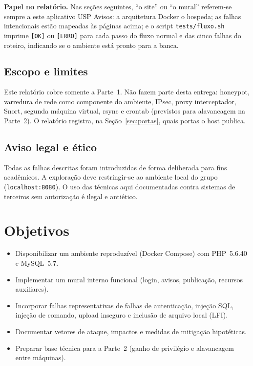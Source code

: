   \textbf{Papel no relatório.} Nas seções seguintes, ``o site'' ou ``o mural'' referem-se sempre a este
  aplicativo USP Avisos: a arquitetura Docker o hospeda; as falhas intencionais estão mapeadas às
  páginas acima; e o script \texttt{tests/fluxo.sh} imprime \texttt{[OK]} ou \texttt{[ERRO]} para cada
  passo do fluxo normal e das cinco falhas do roteiro, indicando se o ambiente está pronto para a banca.
  
  \subsection{Escopo e limites}
  
  Este relatório cobre somente a Parte~1. Não fazem parte desta entrega: honeypot, varredura de rede
  como componente do ambiente, IPsec, proxy interceptador, Snort, segunda máquina virtual, rsync e
  crontab (previstos para alavancagem na Parte~2). O relatório registra, na Seção~\ref{sec:portas},
  quais portas o host publica.
  
  \subsection{Aviso legal e ético}
  
  Todas as falhas descritas foram introduzidas de forma deliberada para fins acadêmicos. A exploração
  deve restringir-se ao ambiente local do grupo (\texttt{localhost:8080}). O uso das técnicas aqui
  documentadas contra sistemas de terceiros sem autorização é ilegal e antiético.
  
  \section{Objetivos}
  
  \begin{itemize}
      \item Disponibilizar um ambiente reproduzível (Docker Compose) com PHP~5.6.40 e MySQL~5.7.
      \item Implementar um mural interno funcional (login, avisos, publicação, recursos auxiliares).
      \item Incorporar falhas representativas de falhas de autenticação, injeção SQL, injeção de
            comando, upload inseguro e inclusão de arquivo local (LFI).
      \item Documentar vetores de ataque, impactos e medidas de mitigação hipotéticas.
      \item Preparar base técnica para a Parte~2 (ganho de privilégio e alavancagem entre máquinas).
  \end{itemize}
  
